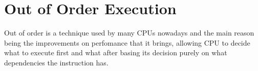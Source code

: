 \chapter{Out of Order Execution}
Out of order is a technique used by many CPUs nowadays and the main reason being the improvements on perfomance that it brings, allowing
CPU to decide what to execute first and what after basing its decision purely on what dependencies the instruction has.

